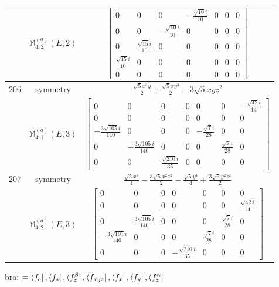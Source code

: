\documentclass[fleqn,8pt,landscape]{jsarticle}
\begin{document}
\begin{longtable}{ccc}
$  $ & $ \mathbb{M}_{4,2}^{(a)}(E,2) $ & $ \begin{bmatrix} 0 & 0 & 0 & - \frac{\sqrt{10} i}{10} & 0 & 0 & 0 \\ 0 & 0 & - \frac{\sqrt{10} i}{10} & 0 & 0 & 0 & 0 \\ 0 & \frac{\sqrt{15} i}{10} & 0 & 0 & 0 & 0 & 0 \\ \frac{\sqrt{15} i}{10} & 0 & 0 & 0 & 0 & 0 & 0 \\ 0 & 0 & 0 & 0 & 0 & 0 & 0 \end{bmatrix} $ \\ \hline
$ 206 $ & $ \text{symmetry} $ & $ \frac{\sqrt{5} x^{3} y}{2} + \frac{\sqrt{5} x y^{3}}{2} - 3 \sqrt{5} x y z^{2} $ \\
$  $ & $ \mathbb{M}_{4,1}^{(a)}(E,3) $ & $ \begin{bmatrix} 0 & 0 & 0 & 0 & 0 & 0 & - \frac{\sqrt{42} i}{14} \\ 0 & 0 & 0 & 0 & 0 & 0 & 0 \\ - \frac{3 \sqrt{105} i}{140} & 0 & 0 & 0 & - \frac{\sqrt{7} i}{28} & 0 & 0 \\ 0 & - \frac{3 \sqrt{105} i}{140} & 0 & 0 & 0 & \frac{\sqrt{7} i}{28} & 0 \\ 0 & 0 & \frac{\sqrt{210} i}{35} & 0 & 0 & 0 & 0 \end{bmatrix} $ \\ \hline
$ 207 $ & $ \text{symmetry} $ & $ \frac{\sqrt{5} x^{4}}{4} - \frac{3 \sqrt{5} x^{2} z^{2}}{2} - \frac{\sqrt{5} y^{4}}{4} + \frac{3 \sqrt{5} y^{2} z^{2}}{2} $ \\
$  $ & $ \mathbb{M}_{4,2}^{(a)}(E,3) $ & $ \begin{bmatrix} 0 & 0 & 0 & 0 & 0 & 0 & 0 \\ 0 & 0 & 0 & 0 & 0 & 0 & \frac{\sqrt{42} i}{14} \\ 0 & \frac{3 \sqrt{105} i}{140} & 0 & 0 & 0 & \frac{\sqrt{7} i}{28} & 0 \\ - \frac{3 \sqrt{105} i}{140} & 0 & 0 & 0 & \frac{\sqrt{7} i}{28} & 0 & 0 \\ 0 & 0 & 0 & - \frac{\sqrt{210} i}{35} & 0 & 0 & 0 \end{bmatrix} $ \\ \hline
\end{longtable}
bra: $=\bra{f_{c}}, \bra{f_{s}}, \bra{f_{z}^{\beta}}, \bra{f_{xyz}}, \bra{f_{x}}, \bra{f_{y}}, \bra{f_{z}^{\alpha}}$
\end{document}
